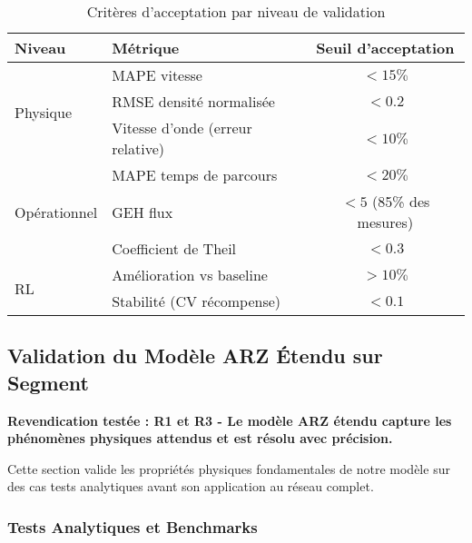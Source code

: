 \begin{table}[htbp]
    \centering
    \caption{Critères d'acceptation par niveau de validation}
    \label{tab:criteres_acceptation}
    \begin{tabular}{|l|l|c|}
        \hline
        \textbf{Niveau}               & \textbf{Métrique}                & \textbf{Seuil d'acceptation} \\
        \hline
        \multirow{3}{*}{Physique}     & MAPE vitesse                     & $< 15\%$                     \\
                                      & RMSE densité normalisée          & $< 0.2$                      \\
                                      & Vitesse d'onde (erreur relative) & $< 10\%$                     \\
        \hline
        \multirow{3}{*}{Opérationnel} & MAPE temps de parcours           & $< 20\%$                     \\
                                      & GEH flux                         & $< 5$ (85\% des mesures)     \\
                                      & Coefficient de Theil             & $< 0.3$                      \\
        \hline
        \multirow{2}{*}{RL}           & Amélioration vs baseline         & $> 10\%$                     \\
                                      & Stabilité (CV récompense)        & $< 0.1$                      \\
        \hline
    \end{tabular}
\end{table}


\subsection{Validation du Modèle ARZ Étendu sur Segment}
\label{sec:validation_arz_segment}

\textbf{Revendication testée : R1 et R3 - Le modèle ARZ étendu capture les phénomènes physiques attendus et est résolu avec précision.}

Cette section valide les propriétés physiques fondamentales de notre modèle sur des cas tests analytiques avant son application au réseau complet.

\subsubsection{Tests Analytiques et Benchmarks}
\label{subsec:tests_analytiques}

